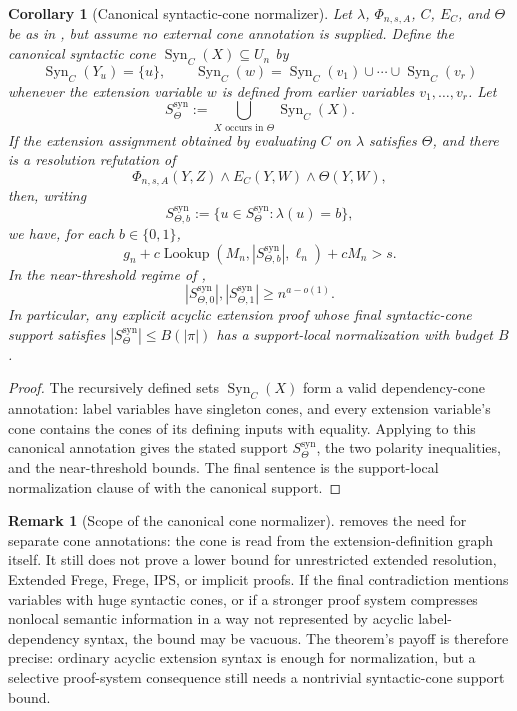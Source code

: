 \documentclass[11pt]{article}
\newtheorem{corollary}[theorem]{Corollary}
\theoremstyle{definition}
\newtheorem{remark}[theorem]{Remark}
\newcommand{\bits}{\{0,1\}}
\newcommand{\Lookup}{\operatorname{Lookup}}
\begin{document}
\begin{corollary}[Canonical syntactic-cone normalizer]\label{cor:canonical-syntactic-cone}
Let \(\lambda\), \(\Phi_{n,s,A}\), \(C\), \(E_C\), and \(\Theta\) be as in , but assume no external cone annotation is supplied.  Define the canonical syntactic cone \(\operatorname{Syn}_C(X)\subseteq U_n\) by
\[
  \operatorname{Syn}_C(Y_u)=\{u\},\qquad
  \operatorname{Syn}_C(w)=\operatorname{Syn}_C(v_1)\cup\cdots\cup\operatorname{Syn}_C(v_r)
\]
whenever the extension variable \(w\) is defined from earlier variables \(v_1,\ldots,v_r\).  Let
\[
  S^{\mathrm{syn}}_\Theta:=\bigcup_{X\text{ occurs in }\Theta}\operatorname{Syn}_C(X).
\]
If the extension assignment obtained by evaluating \(C\) on \(\lambda\) satisfies \(\Theta\), and there is a resolution refutation of
\[
  \Phi_{n,s,A}(Y,Z)\wedge E_C(Y,W)\wedge\Theta(Y,W),
\]
then, writing
\[
  S^{\mathrm{syn}}_{\Theta,b}:=\{u\in S^{\mathrm{syn}}_\Theta:\lambda(u)=b\},
\]
we have, for each \(b\in\bits\),
\[
  g_n+c\Lookup(M_n,|S^{\mathrm{syn}}_{\Theta,b}|,\ell_n)+cM_n>s.
\]
In the near-threshold regime of ,
\[
  |S^{\mathrm{syn}}_{\Theta,0}|,|S^{\mathrm{syn}}_{\Theta,1}|\ge n^{a-o(1)}.
\]
In particular, any explicit acyclic extension proof whose final syntactic-cone support satisfies \(|S^{\mathrm{syn}}_\Theta|\le B(|\pi|)\) has a support-local normalization with budget \(B\).
\end{corollary}

\begin{proof}
The recursively defined sets \(\operatorname{Syn}_C(X)\) form a valid dependency-cone annotation: label variables have singleton cones, and every extension variable's cone contains the cones of its defining inputs with equality.  Applying  to this canonical annotation gives the stated support \(S^{\mathrm{syn}}_\Theta\), the two polarity inequalities, and the near-threshold bounds.  The final sentence is the support-local normalization clause of  with the canonical support.
\end{proof}

\begin{remark}[Scope of the canonical cone normalizer]\label{rem:canonical-syntactic-cone-scope}
 removes the need for separate cone annotations: the cone is read from the extension-definition graph itself.  It still does not prove a lower bound for unrestricted extended resolution, Extended Frege, Frege, IPS, or implicit proofs.  If the final contradiction mentions variables with huge syntactic cones, or if a stronger proof system compresses nonlocal semantic information in a way not represented by acyclic label-dependency syntax, the bound may be vacuous.  The theorem's payoff is therefore precise: ordinary acyclic extension syntax is enough for normalization, but a selective proof-system consequence still needs a nontrivial syntactic-cone support bound.
\end{remark}
\end{document}

